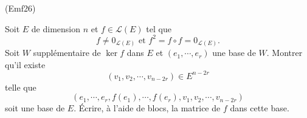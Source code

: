 \begin{tiny}(Emf26)\end{tiny} Soit $E$ de dimension $n$ et $f\in \mathcal{L}(E)$ tel que 
\begin{displaymath}
  f\neq 0_{\mathcal{L}(E)} \text{ et } f^2 = f \circ f = 0_{\mathcal{L}(E)}.
\end{displaymath}
Soit $W$ supplémentaire de $\ker f$ dans $E$ et $(e_1,\cdots, e_r)$ une base de $W$. Montrer qu'il existe 
\begin{displaymath}
  (v_1,v_2,\cdots, v_{n - 2r}) \in E^{n-2r}
\end{displaymath}
telle que
\begin{displaymath}
  (e_1,\cdots,e_r, f(e_1),\cdots, f(e_r),v_1,v_2,\cdots, v_{n - 2r})
\end{displaymath}
soit une base de $E$. \'Ecrire, à l'aide de blocs, la matrice de $f$ dans cette base.